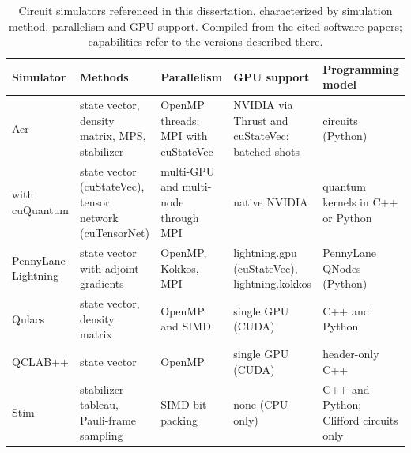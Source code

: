 \begin{table}[htbp]
\caption{Circuit simulators referenced in this dissertation, characterized by simulation method, parallelism and GPU support. Compiled from the cited software papers; capabilities refer to the versions described there.}
\label{tab:bg:simulators}
\centering\footnotesize
\begin{tabularx}{\linewidth}{@{}>{\raggedright\arraybackslash}p{2.6cm}>{\raggedright\arraybackslash}X>{\raggedright\arraybackslash}X>{\raggedright\arraybackslash}X>{\raggedright\arraybackslash}p{2.3cm}@{}}
\toprule
Simulator & Methods & Parallelism & GPU support & Programming model \\
\midrule
\qiskit{} Aer \cite{javadiabhari2024qiskit,doi2023multishotgpu} & state vector, density matrix, MPS, stabilizer & OpenMP threads; MPI with cuStateVec & NVIDIA via Thrust and cuStateVec; batched shots & \qiskit{} circuits (Python) \\
\addlinespace[3pt]
\cudaq{} with cuQuantum \cite{kim2023cudaquantum,bayraktar2023cuquantum} & state vector (cuStateVec), tensor network (cuTensorNet) & multi-GPU and multi-node through MPI & native NVIDIA & quantum kernels in C++ or Python \\
\addlinespace[3pt]
PennyLane Lightning \cite{asadi2024pennylanelightning} & state vector with adjoint gradients & OpenMP, Kokkos, MPI & lightning.gpu (cuStateVec), lightning.kokkos & PennyLane QNodes (Python) \\
\addlinespace[3pt]
Qulacs \cite{suzuki2021qulacs} & state vector, density matrix & OpenMP and SIMD & single GPU (CUDA) & C++ and Python \\
\addlinespace[3pt]
QCLAB++ \cite{vanbeeumen2023qclabpp} & state vector & OpenMP & single GPU (CUDA) & header-only C++ \\
\addlinespace[3pt]
Stim \cite{gidney2021stim} & stabilizer tableau, Pauli-frame sampling & SIMD bit packing & none (CPU only) & C++ and Python; Clifford circuits only \\
\bottomrule
\end{tabularx}
\end{table}

